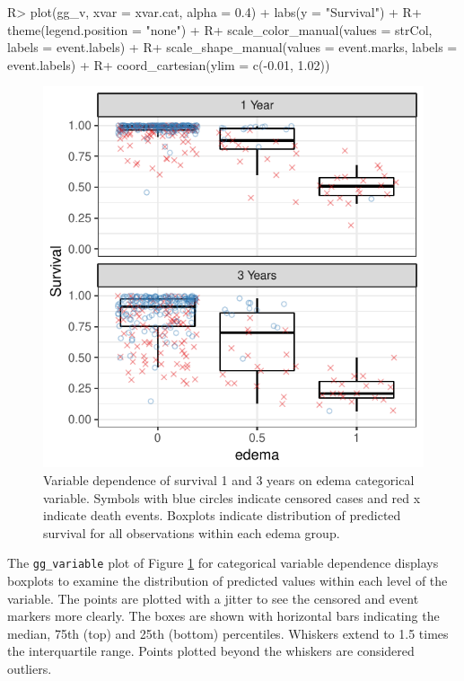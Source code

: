 \documentclass[article]{jss}
\begin{document}
\begin{Schunk}
\begin{Sinput}
R> plot(gg_v, xvar = xvar.cat, alpha = 0.4) + labs(y = "Survival") +
R+   theme(legend.position = "none") +
R+   scale_color_manual(values = strCol, labels = event.labels) +
R+   scale_shape_manual(values = event.marks, labels = event.labels) +
R+   coord_cartesian(ylim = c(-0.01, 1.02))
\end{Sinput}
\begin{figure}[!htb]

{\centering \includegraphics{fig-rfs/rfs-variable-plotCat-1} 

}

\caption[Variable dependence of survival 1 and 3 years on edema categorical variable]{Variable dependence of survival 1 and 3 years on edema categorical variable. Symbols with blue circles indicate censored cases and red x indicate death events. Boxplots indicate distribution of predicted survival for all observations within each edema group.}\label{fig:variable-plotCat}
\end{figure}
\end{Schunk}

The \texttt{gg\_variable} plot of Figure \ref{fig:variable-plotCat} for
categorical variable dependence displays boxplots to examine the
distribution of predicted values within each level of the variable. The
points are plotted with a jitter to see the censored and event markers
more clearly. The boxes are shown with horizontal bars indicating the
median, 75th (top) and 25th (bottom) percentiles. Whiskers extend to 1.5
times the interquartile range. Points plotted beyond the whiskers are
considered outliers.
\end{document}
